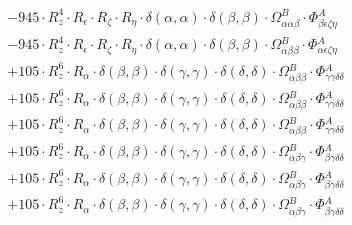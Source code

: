 \documentclass{article}
\begin{document}
\begin{subequations}
\begin{gather}
\begin{array}{c}
 \\[0.2em] 		 - 945 \cdot R_{z}^{4} \cdot R_{\epsilon{}} \cdot R_{\zeta{}} \cdot R_{\eta{}} \cdot \delta{}\left(\alpha{}, \alpha{}\right) \cdot \delta{}\left(\beta{}, \beta{}\right) \cdot \Omega{}^{B}_{\alpha{}\alpha{}\beta{}} \cdot \Phi{}^{A}_{\beta{}\epsilon{}\zeta{}\eta{}} 
 \\[0.2em] 		 - 945 \cdot R_{z}^{4} \cdot R_{\epsilon{}} \cdot R_{\zeta{}} \cdot R_{\eta{}} \cdot \delta{}\left(\alpha{}, \alpha{}\right) \cdot \delta{}\left(\beta{}, \beta{}\right) \cdot \Omega{}^{B}_{\alpha{}\beta{}\beta{}} \cdot \Phi{}^{A}_{\alpha{}\epsilon{}\zeta{}\eta{}} 
 \\[0.2em] 		 + 105 \cdot R_{z}^{6} \cdot R_{\alpha{}} \cdot \delta{}\left(\beta{}, \beta{}\right) \cdot \delta{}\left(\gamma{}, \gamma{}\right) \cdot \delta{}\left(\delta{}, \delta{}\right) \cdot \Omega{}^{B}_{\alpha{}\beta{}\beta{}} \cdot \Phi{}^{A}_{\gamma{}\gamma{}\delta{}\delta{}} 
 \\[0.2em] 		 + 105 \cdot R_{z}^{6} \cdot R_{\alpha{}} \cdot \delta{}\left(\beta{}, \beta{}\right) \cdot \delta{}\left(\gamma{}, \gamma{}\right) \cdot \delta{}\left(\delta{}, \delta{}\right) \cdot \Omega{}^{B}_{\alpha{}\beta{}\beta{}} \cdot \Phi{}^{A}_{\gamma{}\gamma{}\delta{}\delta{}} 
 \\[0.2em] 		 + 105 \cdot R_{z}^{6} \cdot R_{\alpha{}} \cdot \delta{}\left(\beta{}, \beta{}\right) \cdot \delta{}\left(\gamma{}, \gamma{}\right) \cdot \delta{}\left(\delta{}, \delta{}\right) \cdot \Omega{}^{B}_{\alpha{}\beta{}\beta{}} \cdot \Phi{}^{A}_{\gamma{}\gamma{}\delta{}\delta{}} 
 \\[0.2em] 		 + 105 \cdot R_{z}^{6} \cdot R_{\alpha{}} \cdot \delta{}\left(\beta{}, \beta{}\right) \cdot \delta{}\left(\gamma{}, \gamma{}\right) \cdot \delta{}\left(\delta{}, \delta{}\right) \cdot \Omega{}^{B}_{\alpha{}\beta{}\gamma{}} \cdot \Phi{}^{A}_{\beta{}\gamma{}\delta{}\delta{}} 
 \\[0.2em] 		 + 105 \cdot R_{z}^{6} \cdot R_{\alpha{}} \cdot \delta{}\left(\beta{}, \beta{}\right) \cdot \delta{}\left(\gamma{}, \gamma{}\right) \cdot \delta{}\left(\delta{}, \delta{}\right) \cdot \Omega{}^{B}_{\alpha{}\beta{}\gamma{}} \cdot \Phi{}^{A}_{\beta{}\gamma{}\delta{}\delta{}} 
 \\[0.2em] 		 + 105 \cdot R_{z}^{6} \cdot R_{\alpha{}} \cdot \delta{}\left(\beta{}, \beta{}\right) \cdot \delta{}\left(\gamma{}, \gamma{}\right) \cdot \delta{}\left(\delta{}, \delta{}\right) \cdot \Omega{}^{B}_{\alpha{}\beta{}\gamma{}} \cdot \Phi{}^{A}_{\beta{}\gamma{}\delta{}\delta{}} 

\end{array}
\end{gather}
\end{subequations}
\end{document}
